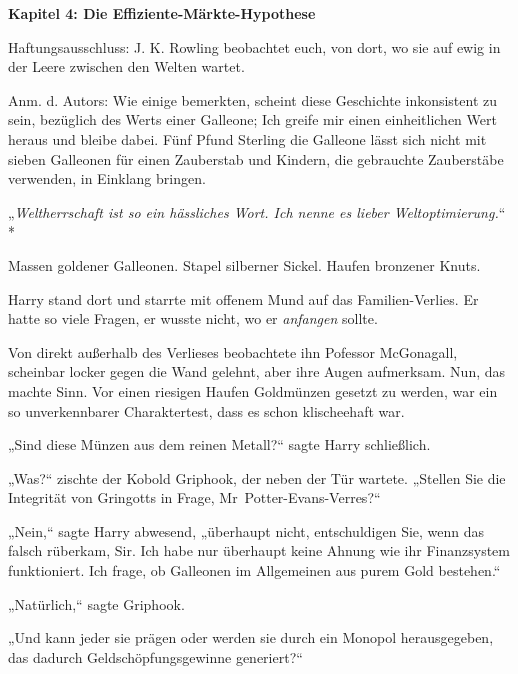 

\hypertarget{die-effiziente-muxe4rkte-hypothese}{%

\textbf{Kapitel 4: Die Effiziente-Märkte-Hypothese}

Haftungsausschluss: J. K. Rowling beobachtet euch, von dort, wo sie auf ewig in der Leere zwischen den Welten wartet.

Anm. d. Autors: Wie einige bemerkten, scheint diese Geschichte inkonsistent zu sein, bezüglich des Werts einer Galleone; Ich greife mir einen einheitlichen Wert heraus und bleibe dabei. Fünf Pfund Sterling die Galleone lässt sich nicht mit sieben Galleonen für einen Zauberstab und Kindern, die gebrauchte Zauberstäbe verwenden, in Einklang bringen.

\later

„\emph{Weltherrschaft ist so ein hässliches Wort. Ich nenne es lieber Weltoptimierung.}“ *

\later

Massen goldener Galleonen. Stapel silberner Sickel. Haufen bronzener Knuts.

Harry stand dort und starrte mit offenem Mund auf das Familien-Verlies. Er hatte so viele Fragen, er wusste nicht, wo er \emph{anfangen} sollte.

Von direkt außerhalb des Verlieses beobachtete ihn Pofessor McGonagall, scheinbar locker gegen die Wand gelehnt, aber ihre Augen aufmerksam. Nun, das machte Sinn. Vor einen riesigen Haufen Goldmünzen gesetzt zu werden, war ein so unverkennbarer Charaktertest, dass es schon klischeehaft war.

„Sind diese Münzen aus dem reinen Metall?“ sagte Harry schließlich.

„Was?“ zischte der Kobold Griphook, der neben der Tür wartete. „Stellen Sie die Integrität von Gringotts in Frage, Mr~Potter-Evans-Verres?“

„Nein,“ sagte Harry abwesend, „überhaupt nicht, entschuldigen Sie, wenn das falsch rüberkam, Sir. Ich habe nur überhaupt keine Ahnung wie ihr Finanzsystem funktioniert. Ich frage, ob Galleonen im Allgemeinen aus purem Gold bestehen.“

„Natürlich,“ sagte Griphook.

„Und kann jeder sie prägen oder werden sie durch ein Monopol herausgegeben, das dadurch Geldschöpfungsgewinne generiert?“

}
